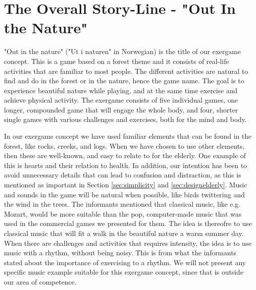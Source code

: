 \section{The Overall Story-Line - "Out In the Nature"}
\label{sec:outinthenature}

"Out in the nature" ("Ut i naturen" in Norwegian) is the title of our exergame concept. This is a game based on a forest theme and it consists of real-life activities that are familiar to most people. The different activities are natural to find and do in the forest or in the nature, hence the game name. The goal is to experience beautiful nature while playing, and at the same time exercise and achieve physical activity. The exergame consists of five individual games, one longer, compounded game that will engage the whole body, and four, shorter single games with various challenges and exercises, both for the mind and body.        

In our exergame concept we have used familiar elements that can be found in the forest, like rocks, creeks, and logs. When we have chosen to use other elements, then these are well-known, and easy to relate to for the elderly. One example of this is hearts and their relation to health. In addition, our intention has been to avoid unnecessary details that can lead to confusion and distraction, as this is mentioned as important in Section \ref{sec:simplicity} and \ref{sec:designelderly}. Music and sounds in the game will be natural when possible, like birds twittering and the wind in the trees. The informants mentioned that classical music, like e.g. Mozart, would be more suitable than the pop, computer-made music that was used in the commercial games we presented for them. The idea is thereofre to use classical music that will fit a walk in the beautiful nature a warm summer day. When there are challenges and activities that requires intensity, the idea is to use music with a rhythm, without being noisy. This is from what the informants stated about the importance of exercising to a rhythm. We will not present any specific music example suitable for this exergame concept, since that is outside our area of competence. 

